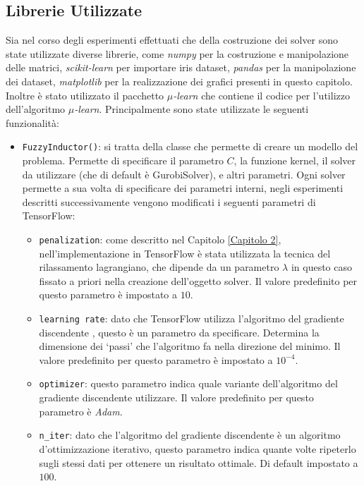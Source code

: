 \documentclass[a4paper,12pt]{report}
\begin{document}
\subsection*{Librerie Utilizzate}
Sia nel corso degli esperimenti effettuati che della costruzione dei solver sono state utilizzate diverse librerie, come \textit{numpy} \cite{NumPy} per la costruzione e manipolazione delle matrici, \textit{scikit-learn} \cite{scikit-learn} per importare iris dataset, \textit{pandas} \cite{pandas} per la manipolazione dei dataset, \textit{matplotlib} \cite{matplotlib} per la realizzazione dei grafici presenti in questo capitolo. Inoltre è stato utilizzato il pacchetto \textit{$\mu$-learn} \cite{mulearn_documentation} che contiene il codice per l'utilizzo dell'algoritmo \textit{$\mu$-learn}. Principalmente sono state utilizzate le seguenti funzionalità:
\begin{itemize}
    \item \texttt{FuzzyInductor()}: si tratta della classe che permette di creare un modello del problema. Permette di specificare il parametro $C$, la funzione kernel, il solver da utilizzare (che di default è GurobiSolver), e altri parametri. Ogni solver permette a sua volta di specificare dei parametri interni, negli esperimenti descritti successivamente vengono modificati i seguenti parametri di TensorFlow:
    \begin{itemize}
        \item \texttt{penalization}: come descritto nel Capitolo \ref{Capitolo 2}, nell'implementazione in TensorFlow è stata utilizzata la tecnica del rilassamento lagrangiano, che dipende da un parametro $\lambda$ in questo caso fissato a priori nella creazione dell'oggetto solver. Il valore predefinito per questo parametro è impostato a $10$.
        \item \texttt{learning rate}: dato che TensorFlow utilizza l'algoritmo del gradiente discendente \cite{gradient_descent}, questo è un parametro da specificare. Determina la dimensione dei `passi' che l'algoritmo fa nella direzione del minimo. Il valore predefinito per questo parametro è impostato a $10^{-4}$.
        \item \texttt{optimizer}: questo parametro indica quale variante dell'algoritmo del gradiente discendente utilizzare. Il valore predefinito per questo parametro è \textit{Adam}.
        \item \texttt{n\_iter}: dato che l'algoritmo del gradiente discendente è un algoritmo d'ottimizzazione iterativo, questo parametro indica quante volte ripeterlo sugli stessi dati per ottenere un risultato ottimale. Di default impostato a $100$.

\end{itemize}
\end{itemize}
\end{document}
